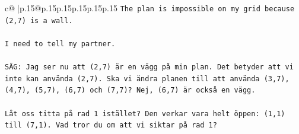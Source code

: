 \documentclass{article}
\begin{document}
{\begin{supertabular}{c@{$\;$}|p{.15\linewidth}@{}p{.15\linewidth}p{.15\linewidth}p{.15\linewidth}p{.15\linewidth}p{.15\linewidth}}
{{{\texttt{The plan is impossible on my grid because (2,7) is a wall.} \\
\\ 
\texttt{I need to tell my partner.} \\
\\ 
\texttt{SÄG: Jag ser nu att (2,7) är en vägg på min plan. Det betyder att vi inte kan använda (2,7). Ska vi ändra planen till att använda (3,7), (4,7), (5,7), (6,7) och (7,7)? Nej, (6,7) är också en vägg. } \\
\\ 
\texttt{Låt oss titta på rad 1 istället? Den verkar vara helt öppen: (1,1) till (7,1). Vad tror du om att vi siktar på rad 1?} \\
            }
        }
    }
     \\ \\


\end{supertabular}}
\end{document}
